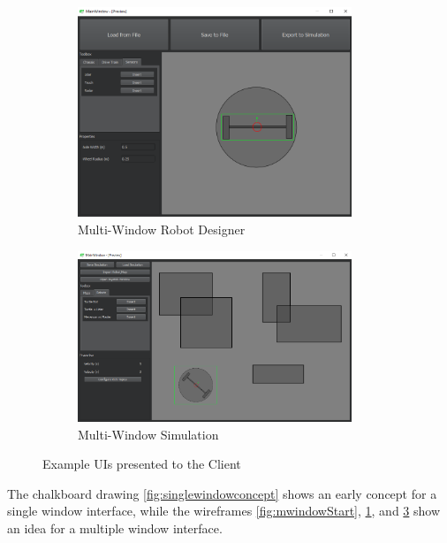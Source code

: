 \begin{figure}
\begin{subfigure}{0.5\textwidth}
	\begin{center}
	\includegraphics[width=0.9\textwidth]{./images_design/RobotDesign.png}
	\caption{Multi-Window Robot Designer}
	\label{fig:mwindowRobot}
	\end{center}
\end{subfigure}
\begin{subfigure}{0.5\textwidth}
	\begin{center}
	\includegraphics[width=0.9\textwidth]{./images_design/Simulation.png}
	\caption{Multi-Window Simulation}
	\label{fig:mwindowSimulation}
	\end{center}
\end{subfigure}
\caption{Example UIs presented to the Client}
\end{figure}
	
	The chalkboard drawing \ref{fig:singlewindowconcept} shows an early concept for a single window interface, while the wireframes \ref{fig:mwindowStart}, \ref{fig:mwindowRobot}, and \ref{fig:mwindowSimulation} show an idea for a multiple window interface. 

